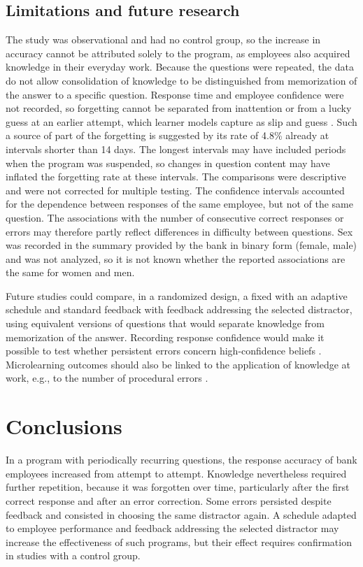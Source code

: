 \documentclass[preprint,12pt,authoryear]{elsarticle}
\begin{document}
\subsection{Limitations and future research}
The study was observational and had no control group, so the increase in accuracy cannot be attributed
solely to the program, as employees also acquired knowledge in their everyday work. Because the
questions were repeated, the data do not allow consolidation of knowledge to be distinguished from
memorization of the answer to a specific question. Response time and employee confidence were not
recorded, so forgetting cannot be separated from inattention or from a lucky guess at an earlier
attempt, which learner models capture as slip and guess \citep{corbett1994}. Such a source of part of
the forgetting is suggested by its rate of 4.8\% already at intervals shorter than 14 days.
The longest intervals may have included periods when the program was suspended, so changes in question
content may have inflated the forgetting rate at these intervals. The comparisons were descriptive and
were not corrected for multiple testing. The confidence intervals accounted for the dependence between
responses of the same employee, but not of the same question. The associations with the number of
consecutive correct responses or errors may therefore partly reflect differences in difficulty between
questions. Sex was recorded in the summary provided by the bank in binary form (female, male) and was not
analyzed, so it is not known whether the reported associations are the same for women and men.

Future studies could compare, in a randomized design, a fixed with an adaptive schedule and standard
feedback with feedback addressing the selected distractor, using equivalent versions of questions that
would separate knowledge from memorization of the answer. Recording response confidence would make it
possible to test whether persistent errors concern high-confidence beliefs \citep{butler2011}.
Microlearning outcomes should also be linked to the application of knowledge at work, e.g., to the
number of procedural errors \citep{blume2010}.

\section{Conclusions}
In a program with periodically recurring questions, the response accuracy of bank employees increased
from attempt to attempt. Knowledge nevertheless required further repetition, because it was forgotten
over time, particularly after the first correct response and after an error correction. Some errors
persisted despite feedback and consisted in choosing the same distractor again. A schedule adapted to
employee performance and feedback addressing the selected distractor may increase the effectiveness of
such programs, but their effect requires confirmation in studies with a control group.





\end{document}
